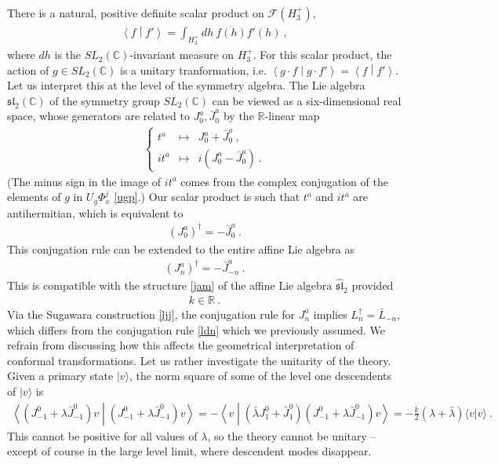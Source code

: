 \documentclass[12pt, a4paper, notitlepage, twoside]{report}
\numberwithin{equation}{section}
\theoremstyle{break}
\begin{document}
There is a natural, positive definite scalar product on $\mathcal{F}(H_3^+)$, 
\begin{align}
 \left\langle f \middle| f' \right\rangle = \int_{H_3^+} dh\ \overline{f(h)} f'(h)\ ,
\end{align}
where $dh$ is the $SL_2({\mathbb{C}})$-invariant measure on $H_3^+$.
For this scalar product, the action of $g\in SL_2({\mathbb{C}})$ is a unitary tranformation, i.e. $\left\langle g\cdot f \middle| g\cdot f'\right\rangle = \left\langle f \middle| f'\right\rangle $.
Let us interpret this at the level of the symmetry algebra.
The Lie algebra $\mathfrak{sl}_2({\mathbb{C}})$ of the symmetry group $SL_2({\mathbb{C}})$ can be viewed as a six-dimensional real space, whose generators are related to $J^a_0, \bar{J}^a_0$ by the ${\mathbb{R}}$-linear map
\begin{align}
 \left\{\begin{array}{lcl} t^a & \mapsto & J_0^a + \bar{J}_0^a \ ,  \\ it^a & \mapsto & i(J^a_0 - \bar{J}^a_0)\ . \end{array}\right. 
\end{align}
(The minus sign in the image of $it^a$ comes from the complex conjugation of the elements of $g$ in $U_g\Phi^j_{x}$ \eqref{ugp}.)
Our scalar product is such that $t^a$ and $it^a$ are antihermitian, which is equivalent to
\begin{align}
 (J^a_0)^\dagger = -\bar{J}^a_0\ .
\label{jzd}
\end{align}
This conjugation rule can be extended to the entire affine Lie algebra as 
\begin{align}
 \boxed{(J^a_n)^\dagger = -\bar{J}^a_{-n}}\ .
\label{jdj}
\end{align}
This is compatible with the structure \eqref{jam} of the affine Lie algebra $\hat{\mathfrak{sl}}_2$ provided 
\begin{align}
 k\in\mathbb{R}\ .
\label{kir}
\end{align}
Via the Sugawara construction \eqref{ljj}, the conjugation rule for $J^a_n$ implies $L_n^\dagger = \bar{L}_{-n}$, which differs from the conjugation rule \eqref{ldn} which we previously assumed. 
We refrain from discussing how this affects the geometrical interpretation of conformal transformations.
Let us rather investigate the unitarity of the theory. 
Given a primary state $|v\rangle$, the norm square of some of the level one descendents of $|v\rangle$ is
\begin{align}
 \left\langle (J^0_{-1}+\lambda\bar{J}^0_{-1})v \middle| (J^0_{-1}+\lambda\bar{J}^0_{-1})v \right\rangle
= -\left\langle v \middle| (\bar{\lambda} J^0_1+\bar{J}^0_1)(J^0_{-1}+\lambda\bar{J}^0_{-1})v \right\rangle 
= -\frac{k}{2}(\lambda+\bar{\lambda}) \langle v| v\rangle\ .
\label{viv}
\end{align}
This cannot be positive for all values of $\lambda$,  
so the theory cannot be unitary -- except of course in the large level limit, where descendent modes disappear. 
\end{document}

